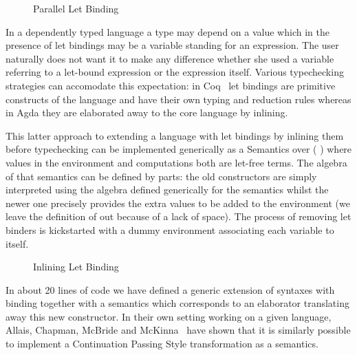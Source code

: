 \begin{figure}[h]
\begin{minipage}{0.45\textwidth}
\end{minipage}\hspace{2em}
\begin{minipage}{0.45\textwidth}
\end{minipage}
\caption{Parallel Let Binding}
\end{figure}

In a dependently typed language a type may depend on a value which
in the presence of let bindings may be a variable standing for an
expression. The user naturally does not want it to make any difference
whether she used a variable referring to a let-bound expression or
the expression itself. Various typechecking strategies can accomodate
this expectation: in Coq~\cite{Coq:manual} let bindings are primitive
constructs of the language and have their own typing and reduction
rules whereas in Agda they are elaborated away to the core language
by inlining.

This latter approach to extending a language  with let bindings
by inlining them before typechecking can be implemented generically as
a Semantics over (  ) where values in the environment and
computations both are let-free terms. The algebra of that semantics can
be defined by parts: the old constructors are simply interpreted using
the algebra defined generically for the  semantics whilst
the newer one precisely provides the extra values to be added to the
environment (we leave the definition of  out because of a lack
of space). The process of removing let binders is kickstarted with a
dummy environment associating each variable to itself.

\begin{figure}[h]
\begin{minipage}{0.50\textwidth}
\end{minipage}\hspace{2em}
\begin{minipage}{0.40\textwidth}
\end{minipage}
\caption{Inlining Let Binding}
\end{figure}

In about 20 lines of code we have defined a generic extension of
syntaxes with binding together with a semantics which corresponds
to an elaborator translating away this new constructor. In their
own setting working on a given language, Allais, Chapman, McBride
and McKinna~\citeyear{allais2017type} have shown that it is similarly
possible to implement a Continuation Passing Style transformation as
a semantics.

